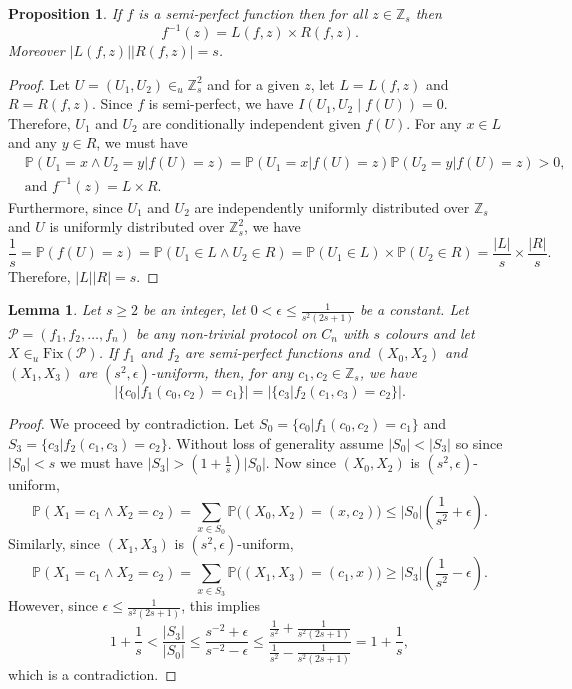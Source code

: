 \documentclass{birkjour}
\newtheorem{lem}[thm]{Lemma}
\newtheorem{prop}[thm]{Proposition}
\theoremstyle{indenteddefinition}
\theoremstyle{indenteddefinition}
\numberwithin{equation}{section}
\renewcommand{\P}{\mathbb{P}}
\renewcommand{\Pr}{\mathcal{P}}
\newcommand{\Z}{\mathbb{Z}}
\newcommand{\Fix}{\mbox{Fix}}
\begin{document}
\begin{prop}
\label{prop:LR=s}
If $f$ is a semi-perfect function then for all $z \in \Z_s$ then
	$$ f^{-1}(z) = L(f,z) \times R(f,z). $$
Moreover $|L(f,z)||R(f,z)| = s$. 
\end{prop}
\begin{proof}
Let $U = (U_1,U_2) \in_u \Z_s^2$ and for a given $z$, let $L = L(f,z)$ and $R = R(f,z)$. Since $f$ is semi-perfect, we have $I(U_1,U_2 \; | \; f(U))=0$. Therefore, $U_1$ and $U_2$ are conditionally independent given $f(U)$. For any $x \in L$ and any $y \in R$, we must have
	\begin{align*}& \P(U_1=x \wedge U_2=y | f(U)=z) = \P(U_1=x | f(U)=z)\P(U_2=y | f(U)=z) > 0, \\
	&\mbox{and }f^{-1}(z) = L \times R.\end{align*} Furthermore, since $U_1$ and $U_2$ are independently uniformly distributed over $\Z_s$ and $U$ is uniformly distributed over $\Z_s^2$, we have
	$$ \frac{1}{s}  = \P( f(U)=z) = \P( U_1 \in L \wedge U_2 \in R) = \P( U_1 \in L) \times \P(U_2 \in R) = \frac{|L|}{s} \times \frac{|R|}{s}. $$
Therefore, $|L||R| = s$.
\end{proof}



\begin{lem}
\label{lem:two_semi-perfect_functions}
Let $s \geq 2$ be an integer, let $0 <\epsilon  \leq \frac{1}{s^2(2s+1)}$ be a constant. Let $\Pr = (f_1,f_2, \ldots ,f_n)$ be any non-trivial protocol on $C_n$ with $s$ colours and let $X \in_u \Fix(\Pr)$. If $f_1$ and $f_2$ are semi-perfect functions and $(X_0,X_2)$ and $(X_1,X_3)$ are $(s^2,\epsilon)$-uniform, then, for any $c_1,c_2 \in \Z_s$, we have 
	$$ | \{ c_0 | f_1(c_0,c_2)=c_1 \} | = | \{ c_3 | f_2(c_1,c_3)=c_2 \} |. $$
\end{lem}
\begin{proof} We proceed by contradiction. 
Let $S_0 = \{ c_0 | f_1(c_0,c_2)=c_1 \}$ and $S_3 = \{ c_3 | f_2(c_1,c_3)=c_2 \}$. Without loss of generality assume $|S_0|<|S_3|$ so since $|S_0| < s$ we must have $|S_3| > \left( 1 + \frac{1}{s} \right)|S_0|$. Now since $(X_0,X_2)$ is $(s^2,\epsilon)$-uniform,
	$$ \P( X_1=c_1 \wedge X_2=c_2) = \sum_{x \in S_0} \P\big( (X_0,X_2) = (x,c_2) \big) 
	\leq |S_0| \left( \frac{1}{s^2} + \epsilon \right). $$
Similarly, since $(X_1,X_3)$ is $(s^2,\epsilon)$-uniform, 
	$$ \P( X_1=c_1 \wedge X_2=c_2) = \sum_{x \in S_3}\P\big( (X_1,X_3) = (c_1,x) \big) 
	\geq |S_3| \left( \frac{1}{s^2} - \epsilon \right). $$
However, since $\epsilon \leq \frac{1}{s^2(2s+1)}$, this implies 
	$$ 1 + \frac{1}{s} < \frac{|S_3|}{|S_0|} \leq \frac{s^{-2}+\epsilon}{s^{-2}-\epsilon} 
	\leq \frac{\frac{1}{s^2}+\frac{1}{s^2(2s+1)}}{\frac{1}{s^2}-\frac{1}{s^2(2s+1)}} = 1 + \frac{1}{s}, $$
which is a contradiction.
\end{proof}
\end{document}

